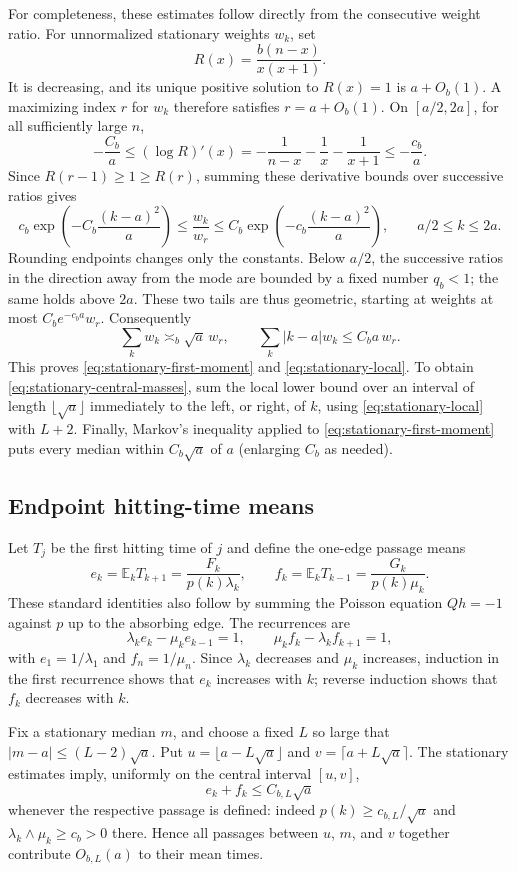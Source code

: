For completeness, these estimates follow directly from the consecutive
weight ratio. For unnormalized stationary weights $w_k$, set
\[
 R(x)=\frac{b(n-x)}{x(x+1)}.
\]
It is decreasing, and its unique positive solution to $R(x)=1$ is
$a+O_b(1)$. A maximizing index $r$ for $w_k$ therefore satisfies
$r=a+O_b(1)$. On $[a/2,2a]$, for all sufficiently large $n$,
\[
 -\frac{C_b}{a}\leq (\log R)'(x)
 =-\frac1{n-x}-\frac1x-\frac1{x+1}
 \leq-\frac{c_b}{a}.
\]
Since $R(r-1)\geq1\geq R(r)$, summing these derivative bounds over
successive ratios gives
\[
 c_b\exp\!\left(-C_b\frac{(k-a)^2}{a}\right)
 \leq\frac{w_k}{w_r}
 \leq C_b\exp\!\left(-c_b\frac{(k-a)^2}{a}\right),
 \qquad a/2\leq k\leq2a.
\]
Rounding endpoints changes only the constants. Below $a/2$, the successive
ratios in the direction away from the mode are bounded by a fixed number
$q_b<1$; the same holds above $2a$. These two tails are thus geometric,
starting at weights at most $C_be^{-c_ba}w_r$.
Consequently
\[
 \sum_k w_k\asymp_b\sqrt a\,w_r,\qquad
 \sum_k|k-a|w_k\leq C_b a\,w_r.
\]
This proves \eqref{eq:stationary-first-moment} and
\eqref{eq:stationary-local}. To obtain
\eqref{eq:stationary-central-masses}, sum the local lower bound over an
interval of length $\lfloor\sqrt a\rfloor$ immediately to the left, or
right, of $k$, using \eqref{eq:stationary-local} with $L+2$.
Finally, Markov's inequality applied to
\eqref{eq:stationary-first-moment} puts every median within
$C_b\sqrt a$ of $a$ (enlarging $C_b$ as needed).


\subsection{Endpoint hitting-time means}
Let $T_j$ be the first hitting time of $j$ and define the one-edge passage
means
\[
 e_k=\mathbb E_kT_{k+1}=\frac{F_k}{p(k)\lambda_k},\qquad
 f_k=\mathbb E_kT_{k-1}=\frac{G_k}{p(k)\mu_k}.
\]
These standard identities also follow by summing the Poisson equation
$Qh=-1$ against $p$ up to the absorbing edge. The recurrences are
\[
 \lambda_ke_k-\mu_ke_{k-1}=1,\qquad
 \mu_kf_k-\lambda_kf_{k+1}=1,
\]
with $e_1=1/\lambda_1$ and $f_n=1/\mu_n$.
Since $\lambda_k$ decreases and $\mu_k$ increases, induction in the first
recurrence shows that $e_k$ increases with $k$; reverse induction shows
that $f_k$ decreases with $k$.

Fix a stationary median $m$, and choose a fixed $L$ so large that
$|m-a|\leq(L-2)\sqrt a$. Put
$u=\lfloor a-L\sqrt a\rfloor$ and
$v=\lceil a+L\sqrt a\rceil$.
The stationary estimates imply, uniformly on the central interval
$[u,v]$,
\[
 e_k+f_k\leq C_{b,L}\sqrt a
\]
whenever the respective passage is defined: indeed
$p(k)\geq c_{b,L}/\sqrt a$ and
$\lambda_k\wedge\mu_k\geq c_b>0$ there. Hence all passages between
$u$, $m$, and $v$ together contribute $O_{b,L}(a)$ to their mean times.

